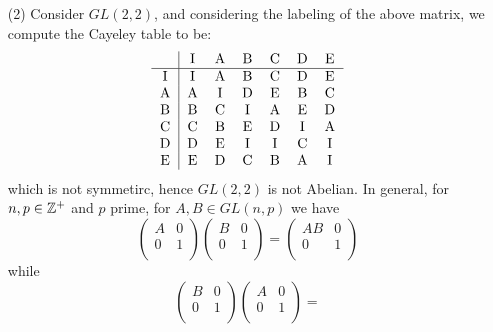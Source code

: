 \begin{example}
\begin{enumerate}
    \item[(2)] Consider $GL(2,2)$, and considering the labeling of the
      above  matrix, we compute the Cayeley table to be:
      \begin{equation*}
        \begin{tabular}{c | c c c c c c}
      & I   &   A   &   B   &   C   &   D   &   E   \\
      \hline
          I & I & A & B & C & D & E \\
          A & A & I & D & E & B & C \\
          B & B & C & I & A & E & D \\
          C & C & B & E & D & I & A \\
          D & D & E & I & I & C & I \\
          E & E & D &C  & B & A & I \\
        \end{tabular}
      \end{equation*}
      which is not symmetirc, hence $GL(2,2)$ is not Abelian. In general, for $n,
      p \in \mathbb{Z}^+$ and $p$ prime, for  $A,B \in GL(n,p)$ we have
      \begin{equation*}
        \begin{pmatrix}
          A   &   0   \\
          0   &   1   \\
        \end{pmatrix}
        \begin{pmatrix}
          B   &   0   \\
          0   &   1   \\
        \end{pmatrix}=
        \begin{pmatrix}
          AB  &   0   \\
          0   &   1   \\
        \end{pmatrix}
      \end{equation*}
      while
      \begin{equation*}
        \begin{pmatrix}
          B   &   0   \\
          0   &   1   \\
        \end{pmatrix}
        \begin{pmatrix}
          A   &   0   \\
          0   &   1   \\
        \end{pmatrix}=

\end{equation*}
\end{enumerate}
\end{example}
